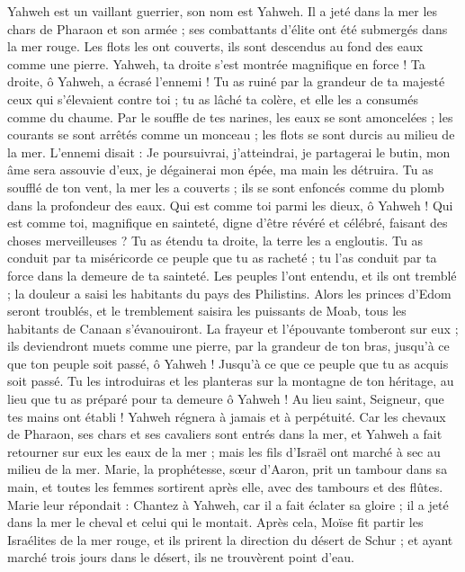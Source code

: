 \begin{multicols}{2}
Yahweh est un vaillant guerrier, son nom est Yahweh.
Il a jeté dans la mer les chars de Pharaon et son armée ; ses combattants d’élite ont été submergés dans la mer rouge.
Les flots les ont couverts, ils sont descendus au fond des eaux comme une pierre.
Yahweh, ta droite s'est montrée magnifique en force ! Ta droite, ô Yahweh, a écrasé l'ennemi !
Tu as ruiné par la grandeur de ta majesté ceux qui s'élevaient contre toi ; tu as lâché ta colère, et elle les a consumés comme du chaume.
Par le souffle de tes narines, les eaux se sont amoncelées ; les courants se sont arrêtés comme un monceau ; les flots se sont durcis au milieu de la mer.
L'ennemi disait : Je poursuivrai, j'atteindrai, je partagerai le butin, mon âme sera assouvie d'eux, je dégainerai mon épée, ma main les détruira.
Tu as soufflé de ton vent, la mer les a couverts ; ils se sont enfoncés comme du plomb dans la profondeur des eaux.
Qui est comme toi parmi les dieux, ô Yahweh ! Qui est comme toi, magnifique en sainteté, digne d'être révéré et célébré, faisant des choses merveilleuses ?
Tu as étendu ta droite, la terre les a engloutis.
Tu as conduit par ta miséricorde ce peuple que tu as racheté ; tu l'as conduit par ta force dans la demeure de ta sainteté.
Les peuples l'ont entendu, et ils ont tremblé ; la douleur a saisi les habitants du pays des Philistins.
Alors les princes d'Edom seront troublés, et le tremblement saisira les puissants de Moab, tous les habitants de Canaan s’évanouiront.
La frayeur et l'épouvante tomberont sur eux ; ils deviendront muets comme une pierre, par la grandeur de ton bras, jusqu'à ce que ton peuple soit passé, ô Yahweh ! Jusqu'à ce que ce peuple que tu as acquis soit passé.
Tu les introduiras et les planteras sur la montagne de ton héritage, au lieu que tu as préparé pour ta demeure ô Yahweh ! Au lieu saint, Seigneur, que tes mains ont établi !
Yahweh régnera à jamais et à perpétuité.
Car les chevaux de Pharaon, ses chars et ses cavaliers sont entrés dans la mer, et Yahweh a fait retourner sur eux les eaux de la mer ; mais les fils d'Israël ont marché à sec au milieu de la mer.
Marie, la prophétesse, sœur d'Aaron, prit un tambour dans sa main, et toutes les femmes sortirent après elle, avec des tambours et des flûtes.
Marie leur répondait : Chantez à Yahweh, car il a fait éclater sa gloire ; il a jeté dans la mer le cheval et celui qui le montait.
Après cela, Moïse fit partir les Israélites de la mer rouge, et ils prirent la direction du désert de Schur ; et ayant marché trois jours dans le désert, ils ne trouvèrent point d'eau.

\end{multicols}
